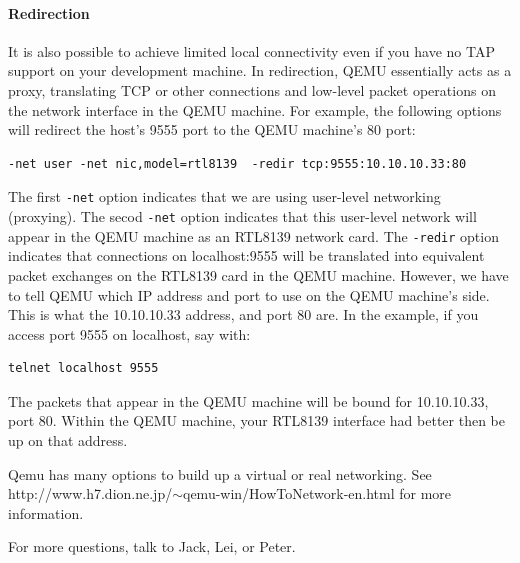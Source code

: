 \documentclass[11pt]{article}
\begin{document}
\paragraph*{Redirection}
It is also possible to achieve limited local connectivity even if you
have no TAP support on your development machine.  In redirection, QEMU
essentially acts as a proxy, translating TCP or other connections and
low-level packet operations on the network interface in the QEMU
machine.  For example, the following options will redirect the host's
9555 port to the QEMU machine's 80 port:
\begin{verbatim}
-net user -net nic,model=rtl8139  -redir tcp:9555:10.10.10.33:80
\end{verbatim}
The first \verb.-net. option indicates that we are using user-level
networking (proxying).  The secod \verb.-net. option indicates that
this user-level network will appear in the QEMU machine as an RTL8139
network card.   The \verb.-redir. option indicates that connections on
localhost:9555 will be translated into equivalent packet exchanges on
the RTL8139 card in the QEMU machine.  However, we have to tell QEMU
which IP address and port to use on the QEMU machine's side.  This is
what the 10.10.10.33 address, and port 80 are.  In the example, if you
access port 9555 on localhost, say with:
\begin{verbatim}
telnet localhost 9555
\end{verbatim}
The packets that appear in the QEMU machine will be bound for
10.10.10.33, port 80.  Within the QEMU machine, your RTL8139 interface
had better then be up on that address. 

Qemu has many options to build up a virtual or real networking. See
http://www.h7.dion.ne.jp/$\sim$qemu-win/HowToNetwork-en.html for more
information.


For more questions, talk to Jack, Lei, or Peter.
\end{document}
